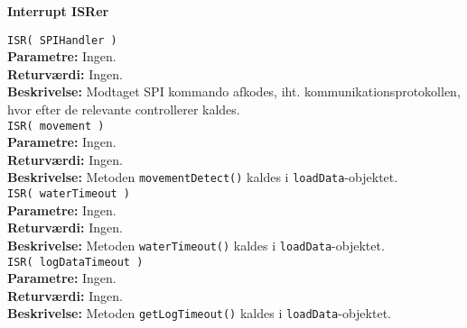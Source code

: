 
{\centering
\textbf{Interrupt ISRer}\par
}


\verb+ISR( SPIHandler ) +\\
\textbf{Parametre:} Ingen. \\
\textbf{Returværdi:} Ingen. \\
\textbf{Beskrivelse:} Modtaget SPI kommando afkodes, iht. kommunikationsprotokollen, hvor efter de relevante controllerer kaldes.  \\

\verb+ISR( movement ) +\\
\textbf{Parametre:} Ingen. \\
\textbf{Returværdi:} Ingen. \\
\textbf{Beskrivelse:} Metoden \verb+movementDetect()+ kaldes i \verb+loadData+-objektet. \\

\verb+ISR( waterTimeout ) +\\
\textbf{Parametre:} Ingen. \\
\textbf{Returværdi:} Ingen. \\
\textbf{Beskrivelse:} Metoden \verb+waterTimeout()+ kaldes i \verb+loadData+-objektet. \\

\verb+ISR( logDataTimeout ) +\\
\textbf{Parametre:} Ingen. \\
\textbf{Returværdi:} Ingen. \\
\textbf{Beskrivelse:} Metoden \verb+getLogTimeout()+ kaldes i \verb+loadData+-objektet. \\
